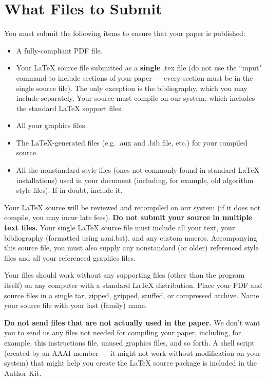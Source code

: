 \documentclass[letterpaper]{article}
\begin{document}
\section{What Files to Submit}
You must submit the following items to ensure that your paper is published:
\begin{itemize}
\item A fully-compliant PDF file.
\item Your  \LaTeX{}  source file submitted as a \textbf{single} .tex file (do not use the ``input" command to include sections of your paper --- every section must be in the single source file). The only exception is the bibliography, which you may include separately. Your source must compile on our system, which includes the standard \LaTeX{} support files.
\item All your graphics files.
\item The \LaTeX{}-generated files (e.g. .aux and .bib file, etc.) for your compiled source.
\item All the nonstandard style files (ones not commonly found in standard \LaTeX{} installations) used in your document (including, for example, old algorithm style files). If in doubt, include it.
\end{itemize}

Your \LaTeX{} source will be reviewed and recompiled on our system (if it does not compile, you may incur late fees).   \textbf{Do not submit your source in multiple text files.} Your single \LaTeX{} source file must include all your text, your bibliography (formatted using aaai.bst), and any custom macros. Accompanying this source file, you must also supply any nonstandard (or older) referenced style files and all your referenced graphics files. 

Your files should work without any supporting files (other than the program itself) on any computer with a standard \LaTeX{} distribution. Place your PDF and source files in a single tar, zipped, gzipped, stuffed, or compressed archive. Name your source file with your last (family) name.

\textbf{Do not send files that are not actually used in the paper.} We don't want you to send us any files not needed for compiling your paper, including, for example, this instructions file, unused graphics files, and so forth.  A shell script (created by an AAAI member --- it might not work without modification on your system) that might help you create the \LaTeX{} source package is included in the Author Kit.
\end{document}
